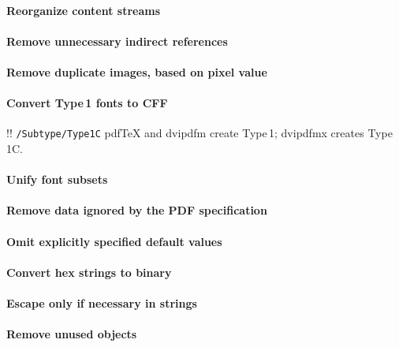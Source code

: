 \documentclass{ltugproc}
\def\cmd{\textsf}
\begin{document}
\paragraph{Reorganize content streams}

\paragraph{Remove unnecessary indirect references}

\paragraph{Remove duplicate images, based on pixel value}

\paragraph{Convert Type\,1 fonts to CFF}

!! \texttt{/Subtype/Type1C}
pdf\TeX{} and \cmd{dvipdfm} create Type\,1; dvipdfmx creates Type\,1C.

\paragraph{Unify font subsets}

\paragraph{Remove data ignored by the PDF specification}

\paragraph{Omit explicitly specified default values}

\paragraph{Convert hex strings to binary}

\paragraph{Escape only if necessary in strings}

\paragraph{Remove unused objects}
\end{document}
